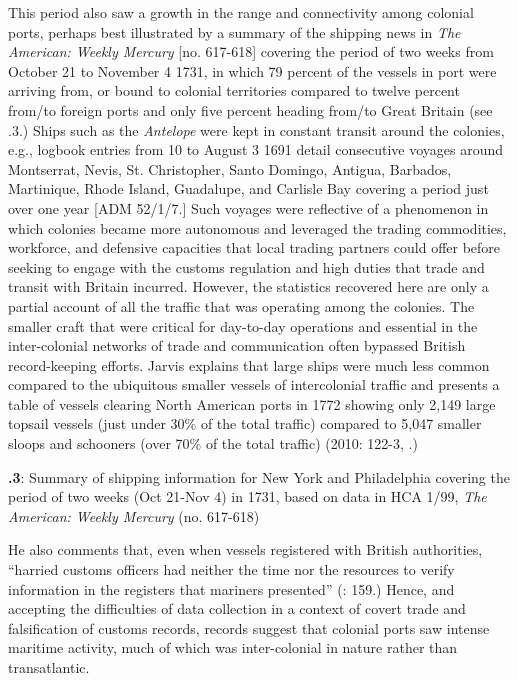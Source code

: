 This period also saw a growth in the range and connectivity among colonial ports, perhaps best illustrated by a summary of the shipping news in \textit{The American: Weekly Mercury} [no. 617-618] covering the period of two weeks from October 21 to November 4 1731, in which 79 percent of the vessels in port were arriving from, or bound to colonial territories compared to twelve percent from/to foreign ports and only five percent heading from/to Great Britain (see .3.) Ships such as the \textit{Antelope} were kept in constant transit around the colonies, e.g., logbook entries from 10 \citealt{June1690} to August 3 1691 detail consecutive voyages around Montserrat, Nevis, St. Christopher, Santo Domingo, Antigua, Barbados, Martinique, Rhode Island, Guadalupe, and Carlisle Bay covering a period just over one year [ADM 52/1/7.] Such voyages were reflective of a phenomenon in which colonies became more autonomous and leveraged the trading commodities, workforce, and defensive capacities that local trading partners could offer before seeking to engage with the customs regulation and high duties that trade and transit with Britain incurred. However, the statistics recovered here are only a partial account of all the traffic that was operating among the colonies. The smaller craft that were critical for day-to-day operations and essential in the inter-colonial networks of trade and communication often bypassed British record-keeping efforts. Jarvis explains that large ships were much less common compared to the ubiquitous smaller vessels of intercolonial traffic and presents a table of vessels clearing North American ports in 1772 showing only 2,149 large topsail vessels (just under 30\% of the total traffic) compared to 5,047 smaller sloops and schooners (over 70\% of the total traffic) (2010: 122-3, .) 

\textbf{.3}: Summary of shipping information for New York and Philadelphia covering the period of two weeks (Oct 21-Nov 4) in 1731, based on data in HCA 1/99, \textit{The American: Weekly Mercury} (no. 617-618) 

  
 

He also comments that, even when vessels registered with British authorities, “harried customs officers had neither the time nor the resources to verify information in the registers that mariners presented” (\citealt{Jarvis2010}: 159.) Hence, and accepting the difficulties of data collection in a context of covert trade and falsification of customs records, records suggest that colonial ports saw intense maritime activity, much of which was inter-colonial in nature rather than transatlantic. 

